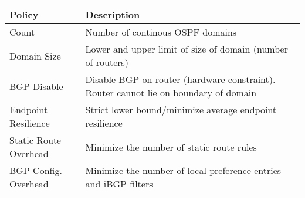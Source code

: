 \begin{table}[t!]
\begin{small}
	\begin{center}
		\begin{tabular}{m{6em} | m{18em} } 
			Policy & Description \\ 
			\hline
			Count & Number of continous OSPF domains  \\ \hline
			Domain Size  & Lower and upper
			limit of size of domain (number of routers) \\ \hline
			BGP \newline Disable & Disable BGP on router (hardware constraint). 
			Router cannot lie on boundary of domain \\ \hline
			Endpoint \newline Resilience & Strict lower bound/minimize average endpoint resilience \\ \hline
			Static Route Overhead & Minimize the number of static route rules \\ \hline
			BGP Config. Overhead & Minimize the number of local preference entries and
			iBGP filters
		\end{tabular}
	\end{center}
	 \label{tab:configpolicysupport} 
\end{small}
\end{table}
